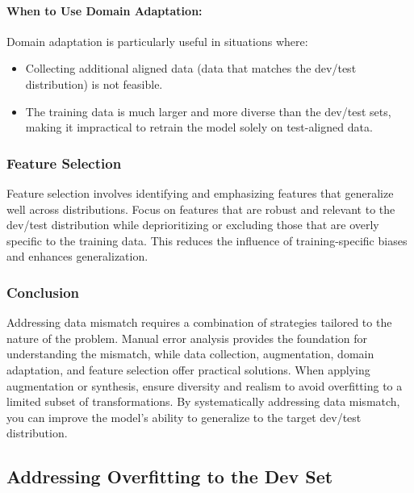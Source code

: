 \documentclass[12pt,openany]{book}
\begin{document}
\paragraph{When to Use Domain Adaptation:}

Domain adaptation is particularly useful in situations where:
\begin{itemize}
    \item Collecting additional aligned data (data that matches the dev/test distribution) is not feasible.
    \item The training data is much larger and more diverse than the dev/test sets, making it impractical to retrain the model solely on test-aligned data.
\end{itemize}


\subsubsection{Feature Selection}

Feature selection involves identifying and emphasizing features that generalize well across distributions. Focus on features that are robust and relevant to the dev/test distribution while deprioritizing or excluding those that are overly specific to the training data. This reduces the influence of training-specific biases and enhances generalization.

\subsubsection{Conclusion}

Addressing data mismatch requires a combination of strategies tailored to the nature of the problem. Manual error analysis provides the foundation for understanding the mismatch, while data collection, augmentation, domain adaptation, and feature selection offer practical solutions. When applying augmentation or synthesis, ensure diversity and realism to avoid overfitting to a limited subset of transformations. By systematically addressing data mismatch, you can improve the model’s ability to generalize to the target dev/test distribution.

\subsection{Addressing Overfitting to the Dev Set}
\end{document}

